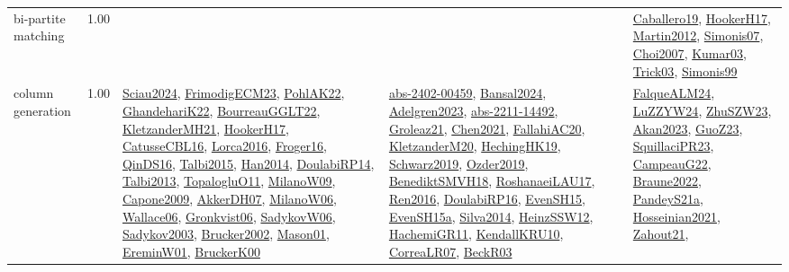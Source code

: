 {\begin{longtable}{p{3cm}r>{\raggedright\arraybackslash}p{6cm}>{\raggedright\arraybackslash}p{6cm}>{\raggedright\arraybackslash}p{8cm}}
\index{bi-partite matching}\index{Algorithms!bi-partite matching}bi-partite matching &  1.00 &  &  & \hyperref[detail:Caballero19]{Caballero19}, \hyperref[detail:HookerH17]{HookerH17}, \hyperref[detail:Martin2012]{Martin2012}, \hyperref[detail:Simonis07]{Simonis07}, \hyperref[detail:Choi2007]{Choi2007}, \hyperref[detail:Kumar03]{Kumar03}, \hyperref[detail:Trick03]{Trick03}, \hyperref[detail:Simonis99]{Simonis99}\\
\index{column generation}\index{Algorithms!column generation}column generation &  1.00 & \hyperref[detail:Sciau2024]{Sciau2024}, \hyperref[detail:FrimodigECM23]{FrimodigECM23}, \hyperref[detail:PohlAK22]{PohlAK22}, \hyperref[detail:GhandehariK22]{GhandehariK22}, \hyperref[detail:BourreauGGLT22]{BourreauGGLT22}, \hyperref[detail:KletzanderMH21]{KletzanderMH21}, \hyperref[detail:HookerH17]{HookerH17}, \hyperref[detail:CatusseCBL16]{CatusseCBL16}, \hyperref[detail:Lorca2016]{Lorca2016}, \hyperref[detail:Froger16]{Froger16}, \hyperref[detail:QinDS16]{QinDS16}, \hyperref[detail:Talbi2015]{Talbi2015}, \hyperref[detail:Han2014]{Han2014}, \hyperref[detail:DoulabiRP14]{DoulabiRP14}, \hyperref[detail:Talbi2013]{Talbi2013}, \hyperref[detail:TopalogluO11]{TopalogluO11}, \hyperref[detail:MilanoW09]{MilanoW09}, \hyperref[detail:Capone2009]{Capone2009}, \hyperref[detail:AkkerDH07]{AkkerDH07}, \hyperref[detail:MilanoW06]{MilanoW06}, \hyperref[detail:Wallace06]{Wallace06}, \hyperref[detail:Gronkvist06]{Gronkvist06}, \hyperref[detail:SadykovW06]{SadykovW06}, \hyperref[detail:Sadykov2003]{Sadykov2003}, \hyperref[detail:Brucker2002]{Brucker2002}, \hyperref[detail:Mason01]{Mason01}, \hyperref[detail:EreminW01]{EreminW01}, \hyperref[detail:BruckerK00]{BruckerK00} & \hyperref[detail:abs-2402-00459]{abs-2402-00459}, \hyperref[detail:Bansal2024]{Bansal2024}, \hyperref[detail:Adelgren2023]{Adelgren2023}, \hyperref[detail:abs-2211-14492]{abs-2211-14492}, \hyperref[detail:Groleaz21]{Groleaz21}, \hyperref[detail:Chen2021]{Chen2021}, \hyperref[detail:FallahiAC20]{FallahiAC20}, \hyperref[detail:KletzanderM20]{KletzanderM20}, \hyperref[detail:HechingHK19]{HechingHK19}, \hyperref[detail:Schwarz2019]{Schwarz2019}, \hyperref[detail:Ozder2019]{Ozder2019}, \hyperref[detail:BenediktSMVH18]{BenediktSMVH18}, \hyperref[detail:RoshanaeiLAU17]{RoshanaeiLAU17}, \hyperref[detail:Ren2016]{Ren2016}, \hyperref[detail:DoulabiRP16]{DoulabiRP16}, \hyperref[detail:EvenSH15]{EvenSH15}, \hyperref[detail:EvenSH15a]{EvenSH15a}, \hyperref[detail:Silva2014]{Silva2014}, \hyperref[detail:HeinzSSW12]{HeinzSSW12}, \hyperref[detail:HachemiGR11]{HachemiGR11}, \hyperref[detail:KendallKRU10]{KendallKRU10}, \hyperref[detail:CorreaLR07]{CorreaLR07}, \hyperref[detail:BeckR03]{BeckR03} & \hyperref[detail:FalqueALM24]{FalqueALM24}, \hyperref[detail:LuZZYW24]{LuZZYW24}, \hyperref[detail:ZhuSZW23]{ZhuSZW23}, \hyperref[detail:Akan2023]{Akan2023}, \hyperref[detail:GuoZ23]{GuoZ23}, \hyperref[detail:SquillaciPR23]{SquillaciPR23}, \hyperref[detail:CampeauG22]{CampeauG22}, \hyperref[detail:Braune2022]{Braune2022}, \hyperref[detail:PandeyS21a]{PandeyS21a}, \hyperref[detail:Hosseinian2021]{Hosseinian2021}, \hyperref[detail:Zahout21]{Zahout21}, 
\end{longtable}}
